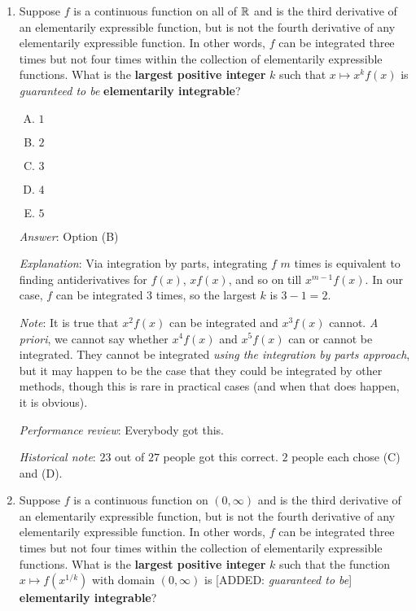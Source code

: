 \documentclass[10pt]{amsart}
\begin{document}
\begin{enumerate}
  {\em Answer}: Option (E)

  {\em Explanation}: Fill in yourself, it's been said often enough.

  {\em Performance review}: $6$ out of $11$ got this. $5$ chose (B).

  {\em Historical note (last year)}: $18$ out of $27$ people got this
  correct. $4$ people chose (D), $2$ people chose (C), $2$ people
  chose (B), and $1$ person chose (A).

\item Suppose $f$ is a continuous function on all of $\mathbb{R}$ and is the
  third derivative of an elementarily expressible function, but is not
  the fourth derivative of any elementarily expressible function. In
  other words, $f$ can be integrated three times but not four times
  within the collection of elementarily expressible functions. What is
  the {\bf largest positive integer} $k$ such that $x \mapsto x^kf(x)$
  is {\em guaranteed to be} {\bf elementarily integrable}?

  \begin{enumerate}[(A)]
  \item $1$
  \item $2$
  \item $3$
  \item $4$
  \item $5$
  \end{enumerate}

  {\em Answer}: Option (B)

  {\em Explanation}: Via integration by parts, integrating $f$ $m$ times is
  equivalent to finding antiderivatives for $f(x)$, $xf(x)$, and so on
  till $x^{m-1}f(x)$. In our case, $f$ can be integrated $3$ times, so
  the largest $k$ is $3 - 1 = 2$.

  {\em Note}: It is true that $x^2f(x)$ can be integrated and
  $x^3f(x)$ cannot. {\em A priori}, we cannot say whether $x^4f(x)$
  and $x^5f(x)$ can or cannot be integrated. They cannot be integrated
  {\em using the integration by parts approach}, but it may happen to
  be the case that they could be integrated by other methods, though
  this is rare in practical cases (and when that does happen, it is
  obvious).

  {\em Performance review}: Everybody got this.

  {\em Historical note}: $23$ out of $27$ people got this
  correct. $2$ people each chose (C) and (D).

\item Suppose $f$ is a continuous function on $(0,\infty)$ and is the
  third derivative of an elementarily expressible function, but is not
  the fourth derivative of any elementarily expressible function. In
  other words, $f$ can be integrated three times but not four times
  within the collection of elementarily expressible functions. What is
  the {\bf largest positive integer} $k$ such that the function $x
  \mapsto f(x^{1/k})$ with domain $(0,\infty)$ is [ADDED: {\em
  guaranteed to be}] {\bf elementarily integrable}?


\end{enumerate}
\end{document}
